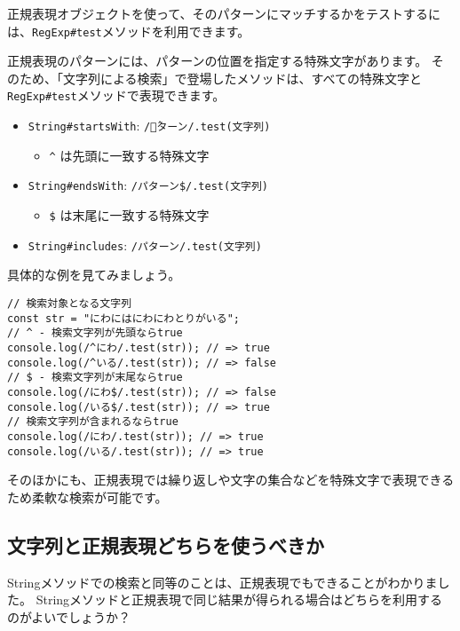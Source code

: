 正規表現オブジェクトを使って、そのパターンにマッチするかをテストするには、\texttt{RegExp\#test}メソッドを利用できます。

正規表現のパターンには、パターンの位置を指定する特殊文字があります。
そのため、「文字列による検索」で登場したメソッドは、すべての特殊文字と\texttt{RegExp\#test}メソッドで表現できます。

\begin{itemize}
\item
  \texttt{String\#startsWith}:
  \texttt{/\^パターン/.test(文字列)}

  \begin{itemize}
  \item
    \texttt{\^} は先頭に一致する特殊文字
  \end{itemize}
\item
  \texttt{String\#endsWith}:
  \texttt{/パターン\$/.test(文字列)}

  \begin{itemize}
  \item
    \texttt{\$} は末尾に一致する特殊文字
  \end{itemize}
\item
  \texttt{String\#includes}:
  \texttt{/パターン/.test(文字列)}
\end{itemize}

具体的な例を見てみましょう。

\begin{lstlisting}
// 検索対象となる文字列
const str = "にわにはにわにわとりがいる";
// ^ - 検索文字列が先頭ならtrue
console.log(/^にわ/.test(str)); // => true
console.log(/^いる/.test(str)); // => false
// $ - 検索文字列が末尾ならtrue
console.log(/にわ$/.test(str)); // => false
console.log(/いる$/.test(str)); // => true
// 検索文字列が含まれるならtrue
console.log(/にわ/.test(str)); // => true
console.log(/いる/.test(str)); // => true
\end{lstlisting}

そのほかにも、正規表現では繰り返しや文字の集合などを特殊文字で表現できるため柔軟な検索が可能です。

\hypertarget{string-or-regexp}{%
\subsection{文字列と正規表現どちらを使うべきか}\label{string-or-regexp}}

Stringメソッドでの検索と同等のことは、正規表現でもできることがわかりました。
Stringメソッドと正規表現で同じ結果が得られる場合はどちらを利用するのがよいでしょうか？

